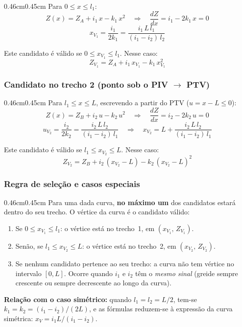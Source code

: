 \documentclass[12pt,letterpaper]{article}
\newenvironment{corpo}{\begin{adjustwidth}{0.46cm}{0.45cm}\justifying}{\end{adjustwidth}}
\begin{document}
\begin{corpo}
Para $0 \le x \le l_1$:
\[
 Z(x) = Z_A + i_1\,x - k_1\,x^2 \quad\Rightarrow\quad \frac{dZ}{dx} = i_1 - 2k_1\,x = 0
\]
\[
 x_{V_1} = \frac{i_1}{2k_1} = \frac{i_1\,L\,l_1}{(i_1-i_2)\,l_2}
\]

Este candidato é válido se $0 \le x_{V_1} \le l_1$. Nesse caso:
\[
 Z_{V_1} = Z_A + i_1\,x_{V_1} - k_1\,x_{V_1}^2
\]
\end{corpo}

\subsubsection*{Candidato no trecho 2 (ponto sob o PIV $\to$ PTV)}

\begin{corpo}
Para $l_1 \le x \le L$, escrevendo a partir do PTV ($u = x - L \le 0$):
\[
 Z(x) = Z_B + i_2\,u - k_2\,u^2 \quad\Rightarrow\quad \frac{dZ}{dx} = i_2 - 2k_2\,u = 0
\]
\[
 u_{V_2} = \frac{i_2}{2k_2} = \frac{i_2\,L\,l_2}{(i_1-i_2)\,l_1} \quad\Rightarrow\quad x_{V_2} = L + \frac{i_2\,L\,l_2}{(i_1-i_2)\,l_1}
\]

Este candidato é válido se $l_1 \le x_{V_2} \le L$. Nesse caso:
\[
 Z_{V_2} = Z_B + i_2\,(x_{V_2}-L) - k_2\,(x_{V_2}-L)^2
\]
\end{corpo}

\subsubsection*{Regra de seleção e casos especiais}

\begin{corpo}
Para uma dada curva, \textbf{no máximo um} dos candidatos estará dentro do seu trecho. O vértice da curva é o candidato válido:

\begin{enumerate}[leftmargin=1.5em]
  \item Se $0 \le x_{V_1} \le l_1$: o vértice está no trecho~1, em $(x_{V_1},\, Z_{V_1})$.
  \item Senão, se $l_1 \le x_{V_2} \le L$: o vértice está no trecho~2, em $(x_{V_2},\, Z_{V_2})$.
  \item Se nenhum candidato pertence ao seu trecho: a curva não tem vértice no intervalo $[0, L]$. Ocorre quando $i_1$ e $i_2$ têm o \emph{mesmo sinal} (greide sempre crescente ou sempre decrescente ao longo da curva).
\end{enumerate}

\textbf{Relação com o caso simétrico:} quando $l_1 = l_2 = L/2$, tem-se $k_1 = k_2 = (i_1-i_2)/(2L)$, e as fórmulas reduzem-se à expressão da curva simétrica: $x_V = i_1 L/(i_1-i_2)$.
\end{corpo}
\end{document}
